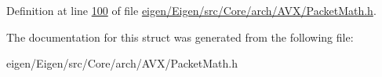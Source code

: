 Definition at line \hyperlink{eigen_2_eigen_2src_2_core_2arch_2_a_v_x_2_packet_math_8h_source_l00100}{100} of file \hyperlink{eigen_2_eigen_2src_2_core_2arch_2_a_v_x_2_packet_math_8h_source}{eigen/\+Eigen/src/\+Core/arch/\+A\+V\+X/\+Packet\+Math.\+h}.



The documentation for this struct was generated from the following file\+:\begin{DoxyCompactItemize}
\item 
eigen/\+Eigen/src/\+Core/arch/\+A\+V\+X/\+Packet\+Math.\+h\end{DoxyCompactItemize}
